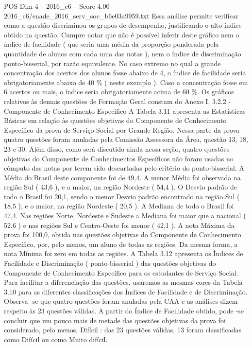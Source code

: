 \begin{textsample}{POS Dim 4 – 2016\_c6 – Score 4.00 – 2016\_c6/enade\_2016\_serv\_soc\_b6e03a9959.txt}
Essa análise permite verificar como a questão discriminou os grupos de desempenho, justificando o alto índice obtido na questão.
Cumpre notar que não é possível inferir deste gráfico nem o índice de facilidade ( que seria uma média da proporção ponderada pela quantidade de alunos com cada uma das notas ), nem o índice de discriminação ponto-bisserial, por razão equivalente.
No caso extremo no qual a grande concentração dos acertos dos alunos fosse abaixo de 4, o índice de facilidade seria obrigatoriamente abaixo de 40 \% ( neste exemplo ).
Caso a concentração fosse em 6 acertos ou mais, o índice seria obrigatoriamente acima de 60 \%.
Os gráficos relativos às demais questões de Formação Geral constam do Anexo I. 3.2.2 - Componente de Conhecimento Específico A Tabela 3.11 apresenta as Estatísticas Básicas em relação às questões objetivas do Componente de Conhecimento Específico da prova de Serviço Social por Grande Região.
Nessa parte da prova quatro questões foram anuladas pela Comissão Assessora da Área, questão 13, 18, 23 e 30.
Além disso, como será discutido ainda nessa seção, quatro questões objetivas do Componente de Conhecimentos Específicos não foram usadas no cômputo das notas por terem sido descartadas pelo critério do ponto-bisserial.
A Média do Brasil deste componente foi de 49,4.
A menor Média foi observada na região Sul ( 43,6 ), e a maior, na região Nordeste ( 54,4 ).
O Desvio padrão de todo o Brasil foi 20,1, sendo o menor Desvio padrão encontrado na região Sul ( 18,5 ), e o maior, na região Nordeste ( 20,5 ).
A Mediana de todo o Brasil foi 47,4.
Nas regiões Norte, Nordeste e Sudeste a Mediana foi maior que a nacional ( 52,6 ) e nas regiões Sul e Centro-Oeste foi menor ( 42,1 ).
A nota Máxima da prova foi 100,0, obtida nas questões objetivas do Componente de Conhecimento Específico, por, pelo menos, um aluno de todas as regiões.
Da mesma forma, a nota Mínima foi zero em todas as regiões.
A Tabela 3.12 apresenta os Índices de Facilidade e Discriminação ( ponto-bisserial ) das questões objetivas do Componente de Conhecimento Específico para os estudantes de Serviço Social.
Para facilitar a diferenciação das questões, usaremos as mesmas cores da Tabela 3.10 para as diferentes classificações dos Índices de Facilidade e de Discriminação.
Observa -se que quatro questões foram anuladas pela CAA e as análises dizem respeito às 23 questões válidas.
A partir do Índice de Facilidade obtido, pode -se concluir que um pouco mais de metade das questões objetivas da prova foi considerado, pelo menos, Difícil : das 23 questões válidas, 13 foram classificadas como Difícil ou como Muito difícil.

\end{textsample}
